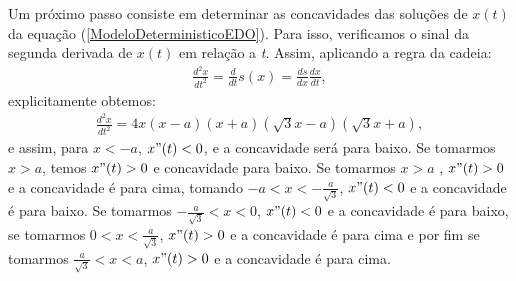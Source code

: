 Um próximo passo consiste em determinar as concavidades das soluções de $x(t)$ da equação (\ref{ModeloDeterministicoEDO}). Para isso, verificamos o sinal da segunda derivada de $x(t)$ em relação a \textit{t}. Assim, aplicando a regra da cadeia:
\begin{eqnarray} \label{regraDaCadeiaDerivadaSegunda}
\frac{d^{2}x}{dt^{2}} = \frac{d}{dt} s(x) = \frac{ds}{dx} \frac{dx}{dt},
\end{eqnarray}
explicitamente obtemos:
\begin{eqnarray}
\frac{d^{2}x}{dt^{2}} = 4x (x-a) (x+a)(\sqrt{3} x-a)(\sqrt{3} x+a),
\end{eqnarray}
e assim, para $x < -a$, $x"(t) < 0$, e a concavidade será para baixo. Se tomarmos $x > a$, temos $x"(t) > 0$ e concavidade para baixo. Se tomarmos $x > a$ ,  $x"(t) > 0$ e a concavidade é para cima, tomando $-a < x < - \frac{a}{\sqrt{3}}$, $x"(t) < 0$ e a concavidade é para baixo. Se tomarmos $-\frac{a}{\sqrt{3}} < x < 0$, $x"(t) < 0$ e a concavidade é para baixo, se tomarmos $0 < x < \frac{a}{\sqrt{3}}$, $x"(t) > 0$ e a concavidade é para cima e por fim se tomarmos $\frac{a}{\sqrt{3}} < x < a$, $x"(t) > 0$ e a concavidade é para cima.


